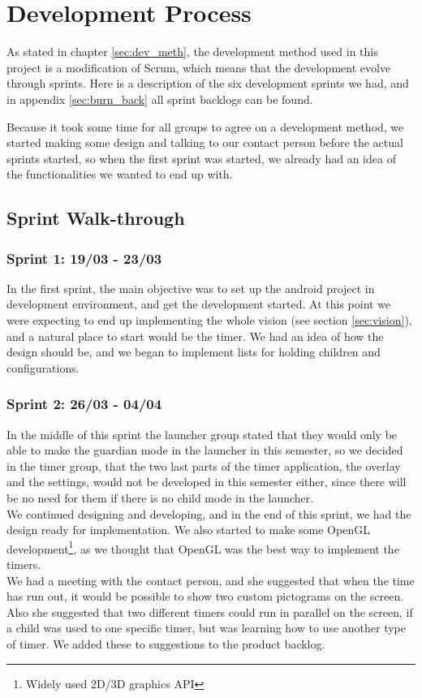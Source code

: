 \chapter{Development Process}
As stated in chapter \ref{sec:dev_meth}, the development method used in this project is a modification of Scrum, which means that the development evolve through sprints. Here is a description of the six development sprints we had, and in appendix \ref{sec:burn_back} all sprint backlogs can be found.


Because it took some time for all groups to agree on a development method, we started making some design and talking to our contact person before the actual sprints started, so when the first sprint was started, we already had an idea of the functionalities we wanted to end up with.

\section{Sprint Walk-through}

\subsection*{Sprint 1: 19/03 - 23/03}
In the first sprint, the main objective was to set up the android project in development environment, and get the development started. At this point we were expecting to end up implementing the whole vision (see section \ref{sec:vision}), and a natural place to start would be the timer. We had an idea of how the design should be, and we began to implement lists for holding children and configurations.

\subsection*{Sprint 2: 26/03 - 04/04}
In the middle of this sprint the launcher group stated that they would only be able to make the guardian mode in the launcher in this semester, so we decided in the timer group, that the two last parts of the timer application, the overlay and the settings, would not be developed in this semester either, since there will be no need for them if there is no child mode in the launcher.\\
	We continued designing and developing, and in the end of this sprint, we had the design ready for implementation. We also started to make some OpenGL development\footnote{Widely used 2D/3D graphics API}, as we thought that OpenGL was the best way to implement the timers.\\
	We had a meeting with the contact person, and she suggested that when the time has run out, it would be possible to show two custom pictograms on the screen. Also she suggested that two different timers could run in parallel on the screen, if a child was used to one specific timer, but was learning how to use another type of timer. We added these to suggestions to the product backlog.

